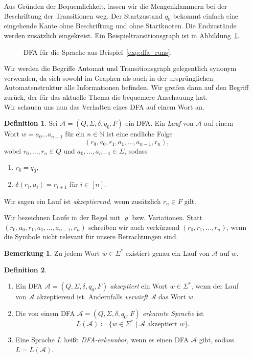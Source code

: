 \documentclass[11pt, a4paper]{article}
\theoremstyle{definition}
\newtheorem{definition}{Definition}[section]
\newtheorem*{remark*}{Bemerkung}
\theoremstyle{plain}
\numberwithin{equation}{section}
\begin{document}
Aus Gründen der Bequemlichkeit, lassen wir die Mengenklammern bei der Beschriftung der Transitionen weg. Der Startzustand $q_0$ bekommt einfach eine eingehende Kante ohne Beschriftung und ohne Startknoten. Die Endzustände werden zusätzlich eingekreist. Ein Beispieltransitionsgraph ist in Abbildung~\ref{fig:dfa_ex1}.
\begin{figure}
	\centering
	
	\caption{DFA für die Sprache aus Beispiel~\ref{exp:dfa_runs}.}
	\label{fig:dfa_ex1}
\end{figure}
Wir werden die Begriffe Automat und Transitionsgraph gelegentlich synonym verwenden, da sich sowohl im Graphen als auch in der ursprünglichen Automatenstruktur alle Informationen befinden. Wir greifen dann auf den Begriff zurück, der für das aktuelle Thema die bequemere Anschauung hat.\\
Wir schauen uns nun das Verhalten eines DFA auf einem Wort an.
\begin{definition}
	Sei $\mathcal{A} = (Q, \Sigma, \delta, q_0, F)$ ein DFA.
	Ein \textit{Lauf} von $\mathcal{A}$ auf einem Wort $w = a_0 \ldots a_{n-1}$ für ein $n \in \mathbb{N}$ ist eine endliche Folge
	$$
		(r_0, a_0, r_1, a_1, \ldots, a_{n-1}, r_n),
	$$
	wobei $r_0, \ldots, r_n \in Q$ und $a_0, \ldots, a_{n-1} \in \Sigma$, sodass
	\begin{enumerate}
		\item $r_0 = q_0$,
		\item $\delta(r_i, a_i) = r_{i+1}$ für $i \in [n]$.
	\end{enumerate}
	Wir sagen ein Lauf ist \textit{akzeptierend}, wenn zusätzlich $r_n \in F$ gilt.
\end{definition}
Wir bezeichnen Läufe in der Regel mit $\varrho$ bzw. Variationen. Statt $(r_0, a_0, r_1, a_1, \ldots, a_{n-1}, r_n)$ schreiben wir auch verkürzend $(r_0, r_1, \ldots, r_n)$, wenn die Symbole nicht relevant für unsere Betrachtungen sind.
\begin{remark*}
	Zu jedem Wort $w \in \Sigma^\ast$ existiert genau ein Lauf von $\mathcal{A}$ auf $w$.
\end{remark*}
\begin{definition}
\
	\begin{enumerate}
		\item Ein DFA $\mathcal{A} = (Q, \Sigma, \delta, q_0, F)$ \textit{akzeptiert} ein Wort $w \in \Sigma^\ast$, wenn der Lauf von $\mathcal{A}$ akzeptierend ist. Andernfalls \textit{verwirft} $\mathcal{A}$ das Wort $w$.
		\item Die von einem DFA $\mathcal{A} = (Q, \Sigma, \delta, q_0, F)$ \textit{erkannte Sprache} ist
			$$
				L(\mathcal{A}) \coloneqq \{ w \in \Sigma^\ast \mid \mathcal{A} \text{ akzeptiert } w \}.
			$$
		\item Eine Sprache $L$ heißt \textit{DFA-erkennbar}, wenn es einen DFA $\mathcal{A}$ gibt, sodass $L = L(\mathcal{A})$.
	\end{enumerate}
\end{definition}
\end{document}
